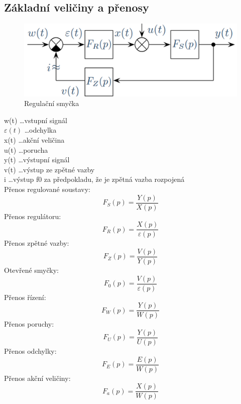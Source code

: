 \subsection*{Základní veličiny a přenosy}
\begin{figure}[H]
    \includegraphics[scale = 0.45]{images/reg.soustava2.png}
    \caption{Regulační smyčka}
\end{figure}
w(t) \dots vstupní signál \\
$\varepsilon(t)$ \dots odchylka \\
x(t) \dots akční veličina \\
u(t) \dots porucha \\
y(t) \dots výstupní signál\\
v(t) \dots výstup ze zpětné vazby\\
i    \dots výstup f0 za předpokladu, že je zpětná vazba rozpojená\\

\noindent
Přenos regulované soustavy:
\begin{equation}
    F_S(p) = \frac{Y(p)}{X(p)}
\end{equation}
Přenos regulátoru:
\begin{equation}
    F_R(p) = \frac{X(p)}{\varepsilon(p)}
\end{equation}
Přenos zpětné vazby:
\begin{equation}
    F_Z(p) = \frac{V(p)}{Y(p)}
\end{equation}
Otevřené smyčky:
\begin{equation}
    F_0(p) = \frac{V(p)}{\varepsilon(p)}
\end{equation}
Přenos řízení:
\begin{equation}
    F_W(p) = \frac{Y(p)}{W(p)}
\end{equation}
Přenos poruchy:
\begin{equation}
    F_U(p) = \frac{Y(p)}{U(p)}
\end{equation}
Přenos odchylky:
\begin{equation}
    F_E(p)=\frac{E(p)}{W(p)}
\end{equation}
Přenos akční veličiny:
\begin{equation}
    F_a(p) = \frac{X(p)}{W(p)}
\end{equation}
